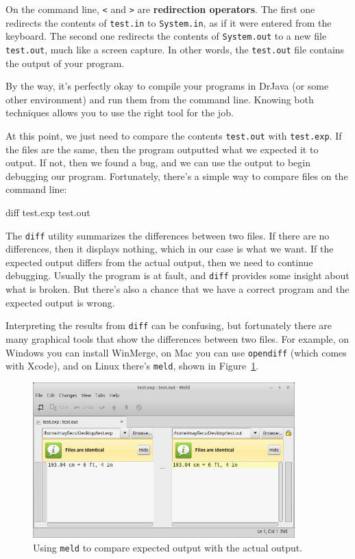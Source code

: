 \documentclass[12pt]{book}
\theoremstyle{exercise}
\newcommand{\java}[1]{\verb"#1"}
\begin{document}

On the command line, {\tt <} and {\tt >} are {\bf redirection operators}.
The first one redirects the contents of {\tt test.in} to \java{System.in}, as if it were entered from the keyboard.
The second one redirects the contents of \java{System.out} to a new file {\tt test.out}, much like a screen capture.
In other words, the {\tt test.out} file contains the output of your program.

By the way, it's perfectly okay to compile your programs in DrJava (or some other environment) and run them from the command line.
Knowing both techniques allows you to use the right tool for the job.

At this point, we just need to compare the contents {\tt test.out} with {\tt test.exp}.
If the files are the same, then the program outputted what we expected it to output.
If not, then we found a bug, and we can use the output to begin debugging our program.
Fortunately, there's a simple way to compare files on the command line:

\begin{stdout}
diff test.exp test.out
\end{stdout}

The {\tt diff} utility summarizes the differences between two files.
If there are no differences, then it displays nothing, which in our case is what we want.
If the expected output differs from the actual output, then we need to continue debugging.
Usually the program is at fault, and {\tt diff} provides some insight about what is broken.
But there's also a chance that we have a correct program and the expected output is wrong.

Interpreting the results from {\tt diff} can be confusing, but fortunately there are many graphical tools that show the differences between two files.
For example, on Windows you can install WinMerge, on Mac you can use {\tt opendiff} (which comes with Xcode), and on Linux there's {\tt meld}, shown in Figure~\ref{fig.meld}.

\begin{figure}[!ht]
\begin{center}
\includegraphics[width=0.9\textwidth]{figs/meld.png}
\caption{Using {\tt meld} to compare expected output with the actual output.}
\label{fig.meld}
\end{center}
\end{figure}
\end{document}
